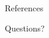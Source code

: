 \documentclass[9pt]{beamer}
\newcommand{\themename}{\textbf{\textsc{metropolis}}\xspace}
\begin{document}




\begin{frame}{References}


\end{frame}









\begin{frame}[standout]
  Questions?
\end{frame}
\end{document}
